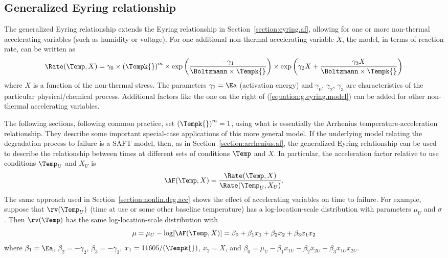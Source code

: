 \subsection{Generalized Eyring relationship}
\label{section:g.eyring.model}

The generalized Eyring relationship extends the Eyring relationship in
Section~\ref{section:eyring.af}, allowing for one or more
non-thermal accelerating variables (such as humidity or voltage).  For
one additional non-thermal accelerating variable $X$, the model, in
terms of reaction rate, can be written as
\begin{equation}
\label{equation:g.eyring.model}
\Rate(\Temp,X)=\gamma_{0} \times \left(\Tempk{}\right)^{m} \times \exp\left(
\frac{-\gamma_{1}}{\Boltzmann  \times \Tempk{}}\right) \times \exp\left(\gamma_{2} X +
\frac{\gamma_{3} X}{\Boltzmann \times \Tempk{} }\right)
\end{equation}
where $X$ is a function of the non-thermal stress. The parameters
$\gamma_{1}=\Ea$ (activation energy) and $\gamma_{0}$, $\gamma_{2}$,
$\gamma_{3}$ are characteristics of the particular physical/chemical
process. Additional factors like the one on the right of
(\ref{equation:g.eyring.model}) can be added for other non-thermal
accelerating variables.

The following sections, following common practice, set
$\left(\Tempk{}\right)^{m}=1$, using what is essentially the Arrhenius
temperature-acceleration relationship. They describe some important
special-case applications of this more general model. 
If the underlying model relating the degradation process 
to failure is a SAFT model, then, as in
Section~\ref{section:arrhenius.af}, the generalized Eyring relationship
can be used to describe the relationship between times
at different sets of conditions $\Temp$ and $X$. In particular, the
acceleration factor relative to use conditions $\Temp_{U}$ and $X_{U}$
is 
\begin{displaymath}
\AF(\Temp,X) = \frac{\Rate(\Temp,X)}{\Rate(\Temp_{U},X_{U})}.
\end{displaymath}
The same approach used in Section~\ref{section:nonlin.deg.acc} shows the
effect of accelerating variables on time to failure. 
For example, suppose that $\rv(\Temp_{U})$ (time at
use or some other baseline temperature) has a log-location-scale
distribution with parameters $\mu_{U}$ and $\sigma$. Then
$\rv(\Temp)$ has the same log-location-scale distribution with
\begin{equation}
\label{equation:geyring.saft.mu.def}
\mu = \mu_{U} -  \log[\AF(\Temp,X)]= \beta_{0} + \beta_{1} x_{1}+
\beta_{2} x_{2}+ \beta_{3} x_{1} x_{2}
\end{equation}
where $\beta_{1}=\Ea$, $\beta_{2}= -\gamma_{2}$,  $\beta_{3}=
-\gamma_{3}$,
$x_{1}=11605/(\Tempk{})$, $x_{2}=X$, and
$\beta_{0}= \mu_{U} - \beta_{1}x_{1U}- \beta_{2}x_{2U}-
\beta_{3}x_{1U}x_{2U}$.

